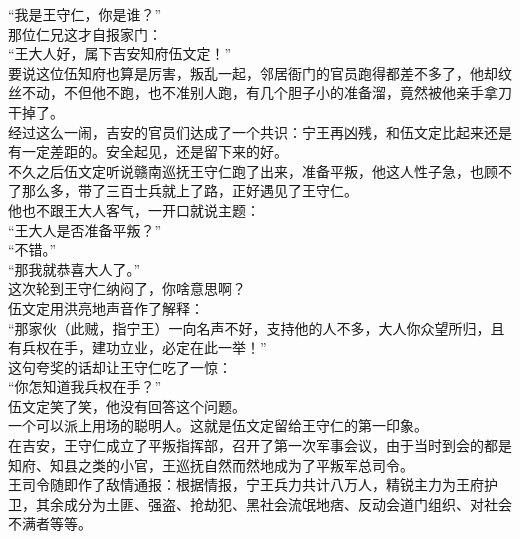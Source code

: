 \begin{multicols}{\theparacolNo}
“我是王守仁，你是谁？”\\

那位仁兄这才自报家门：\\

“王大人好，属下吉安知府伍文定！”\\

要说这位伍知府也算是厉害，叛乱一起，邻居衙门的官员跑得都差不多了，他却纹丝不动，不但他不跑，也不准别人跑，有几个胆子小的准备溜，竟然被他亲手拿刀干掉了。\\

经过这么一闹，吉安的官员们达成了一个共识：宁王再凶残，和伍文定比起来还是有一定差距的。安全起见，还是留下来的好。\\

不久之后伍文定听说赣南巡抚王守仁跑了出来，准备平叛，他这人性子急，也顾不了那么多，带了三百士兵就上了路，正好遇见了王守仁。\\

他也不跟王大人客气，一开口就说主题：\\

“王大人是否准备平叛？”\\

“不错。”\\

“那我就恭喜大人了。”\\

这次轮到王守仁纳闷了，你啥意思啊？\\

伍文定用洪亮地声音作了解释：\\

“那家伙（此贼，指宁王）一向名声不好，支持他的人不多，大人你众望所归，且有兵权在手，建功立业，必定在此一举！”\\

这句夸奖的话却让王守仁吃了一惊：\\

“你怎知道我兵权在手？”\\

伍文定笑了笑，他没有回答这个问题。\\

一个可以派上用场的聪明人。这就是伍文定留给王守仁的第一印象。\\

在吉安，王守仁成立了平叛指挥部，召开了第一次军事会议，由于当时到会的都是知府、知县之类的小官，王巡抚自然而然地成为了平叛军总司令。\\

王司令随即作了敌情通报：根据情报，宁王兵力共计八万人，精锐主力为王府护卫，其余成分为土匪、强盗、抢劫犯、黑社会流氓地痞、反动会道门组织、对社会不满者等等。\\


\end{multicols}
